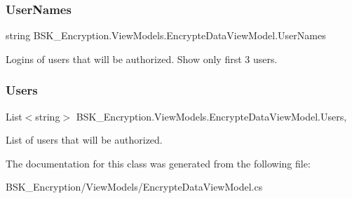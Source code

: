 \subsubsection{\texorpdfstring{User\+Names}{UserNames}}
{\footnotesize\ttfamily string B\+S\+K\+\_\+\+Encryption.\+View\+Models.\+Encrypte\+Data\+View\+Model.\+User\+Names\hspace{0.3cm}{\ttfamily [get]}}



Logins of users that will be authorized. Show only first 3 users. 

\mbox{\label{class_b_s_k___encryption_1_1_view_models_1_1_encrypte_data_view_model_ac7978e5838d18b867c66fa667bb5613e}} 
\subsubsection{\texorpdfstring{Users}{Users}}
{\footnotesize\ttfamily List$<$string$>$ B\+S\+K\+\_\+\+Encryption.\+View\+Models.\+Encrypte\+Data\+View\+Model.\+Users\hspace{0.3cm}{\ttfamily [get]}, {\ttfamily [set]}}



List of users that will be authorized. 



The documentation for this class was generated from the following file\+:\begin{DoxyCompactItemize}
\item 
B\+S\+K\+\_\+\+Encryption/\+View\+Models/Encrypte\+Data\+View\+Model.\+cs\end{DoxyCompactItemize}
